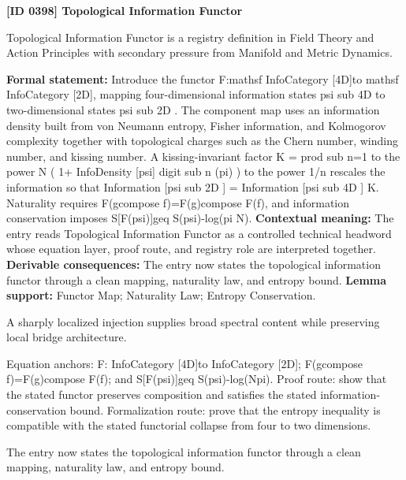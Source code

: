 \clearpage
\noindent\textbf{[ID 0398] Topological Information Functor}\par
\vspace{0.35em}
\begingroup\small
{}
Topological Information Functor is a registry definition in Field Theory and Action Principles with secondary pressure from Manifold and Metric Dynamics.

\begingroup\footnotesize\setlength{\emergencystretch}{3em}\sloppy
\textbf{Formal statement:} Introduce the functor F:mathsf InfoCategory [4D]to mathsf InfoCategory [2D], mapping four-dimensional information states psi sub 4D to two-dimensional states psi sub 2D . The component map uses an information density built from von Neumann entropy, Fisher information, and Kolmogorov complexity together with topological charges such as the Chern number, winding number, and kissing number. A kissing-invariant factor K = prod sub n=1 to the power N ( 1+ InfoDensity [psi] digit sub n (pi) ) to the power 1/n rescales the information so that Information [psi sub 2D ] = Information [psi sub 4D ] K. Naturality requires F(gcompose f)=F(g)compose F(f), and information conservation imposes S[F(psi)]geq S(psi)-log(pi N). \textbf{Contextual meaning:} The entry reads Topological Information Functor as a controlled technical headword whose equation layer, proof route, and registry role are interpreted together. \textbf{Derivable consequences:} The entry now states the topological information functor through a clean mapping, naturality law, and entropy bound. \textbf{Lemma support:} Functor Map; Naturality Law; Entropy Conservation.\par
\endgroup

A sharply localized injection supplies broad spectral content while preserving local bridge architecture.

Equation anchors: F: InfoCategory [4D]to InfoCategory [2D]; F(gcompose f)=F(g)compose F(f); and S[F(psi)]geq S(psi)-log(Npi). Proof route: show that the stated functor preserves composition and satisfies the stated information-conservation bound. Formalization route: prove that the entropy inequality is compatible with the stated functorial collapse from four to two dimensions.

The entry now states the topological information functor through a clean mapping, naturality law, and entropy bound.
\endgroup

